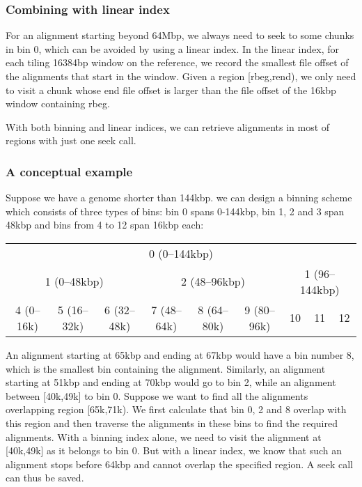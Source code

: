 \documentclass[10pt]{article}
\begin{document}
\subsubsection{Combining with linear index}
For an alignment starting beyond 64Mbp, we always need to seek to some
chunks in bin 0, which can be avoided by using a linear index. In the
linear index, for each tiling 16384bp window on the reference, we record
the smallest file offset of the alignments that start in the
window. Given a region [rbeg,rend), we only need to visit a chunk whose
end file offset is larger than the file offset of the 16kbp window
containing rbeg.

With both binning and linear indices, we can retrieve alignments in most
of regions with just one seek call.

\subsubsection{A conceptual example}
Suppose we have a genome shorter than 144kbp. we can design a binning
scheme which consists of three types of bins: bin 0 spans 0-144kbp, bin
1, 2 and 3 span 48kbp and bins from 4 to 12 span 16kbp each:

\begin{table}[h]
  \centering
  {\small\begin{tabular}{|c|c|c|c|c|c|c|c|c|}
    \cline{1-9}
    \multicolumn{9}{|c|}{0 (0--144kbp)}\\\cline{1-9}
    \multicolumn{3}{|c|}{1 (0--48kbp)} & \multicolumn{3}{c|}{2 (48--96kbp)} & \multicolumn{3}{c|}{1 (96--144kbp)} \\\cline{1-9}
    4 (0--16k) & 5 (16--32k) & 6 (32--48k) & 7 (48--64k) & 8 (64--80k) & 9 (80--96k) & 10 & 11 & 12 \\
    \cline{1-9}
  \end{tabular}}
\end{table}

An alignment starting at 65kbp and ending at 67kbp would have a bin
number 8, which is the smallest bin containing the alignment. Similarly,
an alignment starting at 51kbp and ending at 70kbp would go to bin 2,
while an alignment between [40k,49k] to bin 0. Suppose we want to find
all the alignments overlapping region [65k,71k). We first calculate that
bin 0, 2 and 8 overlap with this region and then traverse the alignments
in these bins to find the required alignments. With a binning index
alone, we need to visit the alignment at [40k,49k] as it belongs to bin
0. But with a linear index, we know that such an alignment stops before
64kbp and cannot overlap the specified region. A seek call can thus be
saved.
\end{document}
